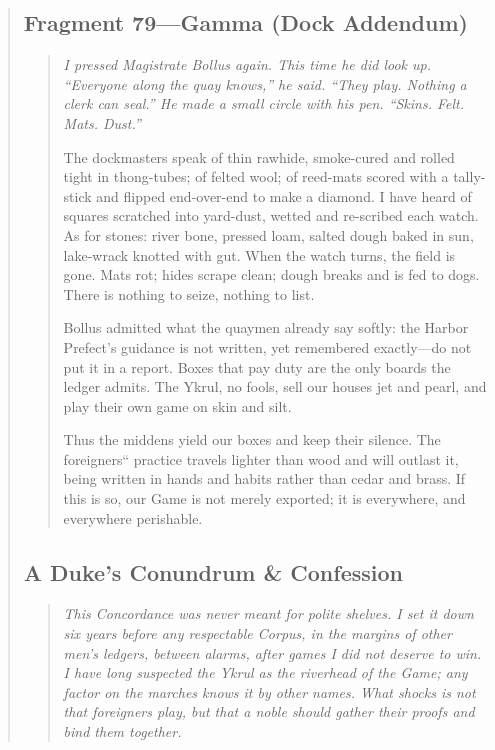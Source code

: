 \documentclass[11pt]{article}
\begin{document}
\begin{quote}
\medskip
\subsection*{Fragment 79---Gamma (Dock Addendum)}
\begin{quote}\small\itshape
\noindent I pressed Magistrate Bollus again. This time he did look up. ``Everyone along the quay knows,'' he said. ``They play. Nothing a clerk can seal.'' He made a small circle with his pen. ``Skins. Felt. Mats. Dust.''

\medskip
\noindent The dockmasters speak of thin rawhide, smoke-cured and rolled tight in thong-tubes; of felted wool; of reed-mats scored with a tally-stick and flipped end-over-end to make a diamond. I have heard of squares scratched into yard-dust, wetted and re-scribed each watch. As for stones: river bone, pressed loam, salted dough baked in sun, lake-wrack knotted with gut. When the watch turns, the field is gone. Mats rot; hides scrape clean; dough breaks and is fed to dogs. There is nothing to seize, nothing to list.

\medskip
\noindent Bollus admitted what the quaymen already say softly: the Harbor Prefect's guidance is not written, yet remembered exactly---do not put it in a report. Boxes that pay duty are the only boards the ledger admits. The Ykrul, no fools, sell our houses jet and pearl, and play their own game on skin and silt.

\medskip
\noindent Thus the middens yield our boxes and keep their silence. The foreigners`` practice travels lighter than wood and will outlast it, being written in hands and habits rather than cedar and brass. If this is so, our Game is not merely exported; it is everywhere, and everywhere perishable.
\end{quote}

\subsection*{A Duke's Conundrum \& Confession}

\begin{quote}\small\itshape
This \emph{Concordance} was never meant for polite shelves. I set it down six years before any respectable \emph{Corpus}, in the margins of other men's ledgers, between alarms, after games I did not deserve to win. I have long suspected the Ykrul as the riverhead of the Game; any factor on the marches knows it by other names. What shocks is not that foreigners play, but that a noble should gather their proofs and bind them together.


\end{quote}
\end{quote}
\end{document}
